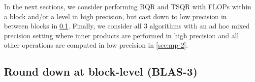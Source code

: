 

In the next sections, we consider performing BQR and TSQR with FLOPs within a block and/or a level in high precision, but cast down to low precision in between blocks in \ref{sec:mp-b}.
Finally, we consider all 3 algorithms with an ad hoc mixed precision setting where inner products are performed in high precision and all other operations are computed in low precision in \ref{sec:mp-2}.


\subsection{Round down at block-level (BLAS-3)}\label{sec:mp-b}
